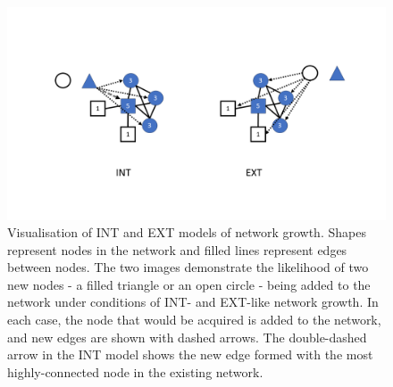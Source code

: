 \documentclass[
  man]{apa6}
\begin{document}
\begin{figure}
\centering
\includegraphics{Images/INT-EXT.png}
\caption{\label{fig:INT-EXT-vis}Visualisation of INT and EXT models of network growth. Shapes represent nodes in the network and filled lines represent edges between nodes. The two images demonstrate the likelihood of two new nodes - a filled triangle or an open circle - being added to the network under conditions of INT- and EXT-like network growth. In each case, the node that would be acquired is added to the network, and new edges are shown with dashed arrows. The double-dashed arrow in the INT model shows the new edge formed with the most highly-connected node in the existing network.}
\end{figure}
\end{document}
